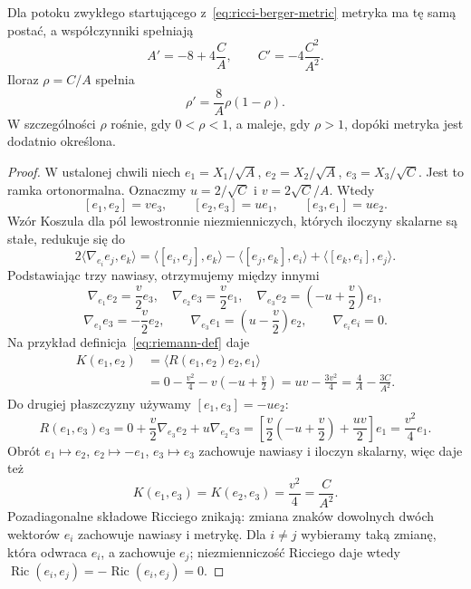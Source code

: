 \begin{stwierdzenie}
\label{prop:ricci-berger}
Dla potoku zwykłego startującego z~\eqref{eq:ricci-berger-metric}
metryka ma tę samą postać, a współczynniki spełniają
\begin{equation}\label{eq:ricci-berger-ode}
 A'=-8+4\frac CA,\qquad
 C'=-4\frac{C^2}{A^2}.
\end{equation}
Iloraz $\rho=C/A$ spełnia
\begin{equation}\label{eq:ricci-berger-ratio}
 \rho'=\frac{8}{A}\rho(1-\rho).
\end{equation}
W szczególności $\rho$ rośnie, gdy $0<\rho<1$,
a maleje, gdy $\rho>1$, dopóki metryka jest dodatnio
określona.
\end{stwierdzenie}
\begin{proof}
W ustalonej chwili niech
$e_1=X_1/\sqrt A$, $e_2=X_2/\sqrt A$,
$e_3=X_3/\sqrt C$. Jest to ramka ortonormalna.
Oznaczmy $u=2/\sqrt C$ i $v=2\sqrt C/A$. Wtedy
\[
 [e_1,e_2]=v e_3,\qquad
 [e_2,e_3]=u e_1,\qquad
 [e_3,e_1]=u e_2.
\]
Wzór Koszula dla pól lewostronnie niezmienniczych,
których iloczyny skalarne są stałe, redukuje się do
\[
 2\langle\nabla_{e_i}e_j,e_k\rangle
 =\langle[e_i,e_j],e_k\rangle
  -\langle[e_j,e_k],e_i\rangle
  +\langle[e_k,e_i],e_j\rangle.
\]
Podstawiając trzy nawiasy, otrzymujemy między innymi
\[
 \nabla_{e_1}e_2=\frac v2e_3,\quad
 \nabla_{e_2}e_3=\frac v2e_1,\quad
 \nabla_{e_3}e_2=\left(-u+\frac v2\right)e_1,
\]
\[
 \nabla_{e_1}e_3=-\frac v2e_2,\qquad
 \nabla_{e_3}e_1=\left(u-\frac v2\right)e_2,
 \qquad \nabla_{e_i}e_i=0.
\]
Na przykład definicja~\eqref{eq:riemann-def} daje
\[
 \begin{split}
 K(e_1,e_2)
 &=\langle R(e_1,e_2)e_2,e_1\rangle\\
 &=0-\frac{v^2}{4}
     -v\left(-u+\frac v2\right)
  =uv-\frac{3v^2}{4}
  =\frac4A-\frac{3C}{A^2}.
 \end{split}
\]
Do drugiej płaszczyzny używamy $[e_1,e_3]=-u e_2$:
\[
 R(e_1,e_3)e_3
 =0+\frac v2\nabla_{e_3}e_2+u\nabla_{e_2}e_3
 =\left[\frac v2\left(-u+\frac v2\right)
         +\frac{uv}{2}\right]e_1
 =\frac{v^2}{4}e_1.
\]
Obrót $e_1\mapsto e_2$, $e_2\mapsto-e_1$, $e_3\mapsto e_3$
zachowuje nawiasy i iloczyn skalarny, więc daje też
\[
 K(e_1,e_3)=K(e_2,e_3)=\frac{v^2}{4}=\frac C{A^2}.
\]
Pozadiagonalne składowe Ricciego znikają: zmiana znaków
dowolnych dwóch wektorów $e_i$ zachowuje nawiasy i metrykę.
Dla $i\ne j$ wybieramy taką zmianę, która odwraca $e_i$,
a zachowuje $e_j$; niezmienniczość Ricciego daje wtedy
$\operatorname{Ric}(e_i,e_j)=-\operatorname{Ric}(e_i,e_j)=0$.

\end{proof}
